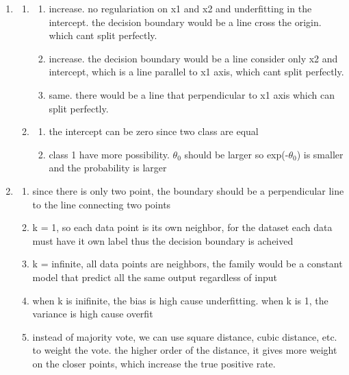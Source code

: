 \documentclass[12pt]{article}
\begin{document}
\begin{enumerate}
\item
\begin{enumerate}
\item 
\begin{enumerate}
    \item increase. no regulariation on x1 and x2 and underfitting in the intercept. the decision boundary would be a line cross the origin. which cant split perfectly.
    \item increase. the decision boundary would be a line consider only x2 and intercept, which is a line parallel to x1 axis, which cant split perfectly.
    \item same. there would be a line that perpendicular to x1 axis which can split perfectly.
\end{enumerate}
\item
\begin{enumerate}
    \item the intercept can be zero since two class are equal
    \item class 1 have more possibility. $\theta_0$ should be larger so exp(-$\theta_0$) is smaller and the probability is larger
\end{enumerate}
\end{enumerate}

\item
\begin{enumerate}
\item since there is only two point, the boundary should be a perpendicular line to the line connecting two points
\item k =  1, so each data point is its own neighbor, for the dataset each data must have it own label thus the decision boundary is acheived
\item k = infinite, all data points are neighbors, the family would be a constant model that predict all the same output regardless of input 
\item when k is inifinite, the bias is high cause underfitting. when k is 1, the variance is high cause overfit
\item instead of majority vote, we can use square distance, cubic distance, etc. to weight the vote. the higher order of the distance, it gives more weight on the closer points, which increase the true positive rate.  
\end {enumerate}


\end{enumerate}
\end{document}
